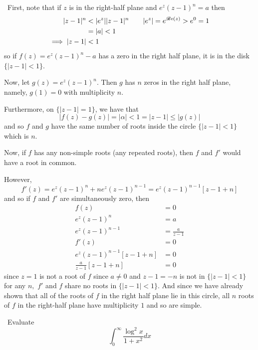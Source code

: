 \documentclass[12pt]{Qual}
\begin{document}
\begin{solution}$\,$
First, note that if $z$ is in the right-half plane and $e^z(z-1)^n=a$ then \begin{align*}
    |z-1|^n&<|e^z||z-1|^n\qquad |e^z|=e^{\re(z)}>e^0=1\\
    &=|a|<1\\
    \implies |z-1|&<1
\end{align*} so if $f(z)=e^z(z-1)^n-a$ has a zero in the right half plane, it is in the disk $\{|z-1|<1\}$.

Now, let $g(z)=e^z(z-1)^n$. Then $g$ has $n$ zeros in the right half plane, namely, $g(1)=0$ with multiplicity $n$.

Furthermore, on $\{|z-1|=1\}$, we have that $$|f(z)-g(z)|=|\alpha|<1=|z-1|\le|g(z)|$$ and so $f$ and $g$ have the same number of roots inside the circle $\{|z-1|<1\}$ which is $n.$

Now, if $f$ has any non-simple roots (any repeated roots), then $f$ and $f'$ would have a root in common.

However, $$f'(z)=e^z(z-1)^n+ne^z(z-1)^{n-1}=e^z(z-1)^{n-1}[z-1+n]$$ and so if $f$ and $f'$ are simultaneously zero, then \begin{align*}
    f(z)&=0\\
    e^z(z-1)^n&=a\\
    e^z(z-1)^{n-1}&=\frac{a}{z-1}\\
    f'(z)&=0\\
    e^z(z-1)^{n-1}[z-1+n]&=0\\
    \frac{a}{z-1}[z-1+n]&=0
\end{align*} since $z=1$ is not a root of $f$ since $a\not=0$ and $z-1=-n$ is not in $\{|z-1|<1\}$ for any $n,$ $f'$ and $f$ share no roots in $\{|z-1|<1\}$. And since we have already shown that all of the roots of $f$ in the right half plane lie in this circle, all $n$ roots of $f$ in the right-half plane have multiplicity $1$ and so are simple.
\end{solution}
\newpage




\begin{problem} $\,$
Evaluate $$\int_0^\infty\frac{\log^2x}{1+x^2}dx$$
\end{problem}
\end{document}
